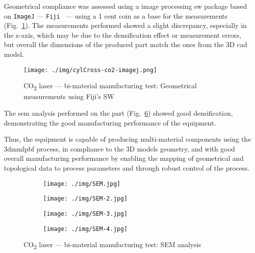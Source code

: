 Geometrical compliance was assessed using a image processing \gls{sw} package
based on \texttt{ImageJ} ---
\texttt{Fiji}~\cite{fijiImageJ,schindelin2012fiji} --- using a 1 cent coin as a
base for the measurements (Fig.~\ref{fig:cylCross-co2-imagej}). The measurements
performed showed a slight discrepancy, especially in the z-axis, which may be
due to the densification effect or measurement errors, but overall the dimensions of the produced part
match the ones from the 3D \gls{cad} model.

\begin{figure}[htbp!]
  \centering
  \texttt{[image: ./img/cylCross-co2-imagej.png]}%
  \caption{CO\textsubscript{2} laser --- bi-material manufacturing test:
    Geometrical measurements using Fiji's SW}%
  \label{fig:cylCross-co2-imagej}
\end{figure}

The \gls{sem} analysis performed on the part
(Fig.~\ref{fig:sem-analysis}) showed good densification, demonstrating the good
manufacturing performance of the equipment.

Thus, the equipment is capable of
producing multi-material components using the \gls{3dmmlpbf} process, in
compliance to the 3D models geometry, and with good overall manufacturing
performance by enabling the mapping of geometrical and topological data to
process parameters and through robust control of the process.
%
\begin{figure}[htb!]
  \centering
  \begin{subfigure}[t]{.48\textwidth}
    \texttt{[image: ./img/SEM.jpg]}%
  \label{fig:sem}
  \end{subfigure}
%
  \begin{subfigure}[t]{.48\textwidth}
    \texttt{[image: ./img/SEM-2.jpg]}%
  \label{fig:sem-2}
  \end{subfigure}
  \begin{subfigure}[t]{.48\textwidth}
    \texttt{[image: ./img/SEM-3.jpg]}%
  \label{fig:sem-3}
\end{subfigure}
  \begin{subfigure}[t]{.48\textwidth}
    \texttt{[image: ./img/SEM-4.jpg]}%
  \label{fig:sem-4}
  \end{subfigure}
  \caption{CO\textsubscript{2} laser --- bi-material manufacturing test:
    SEM analysis}%
  \label{fig:sem-analysis}
\end{figure}

